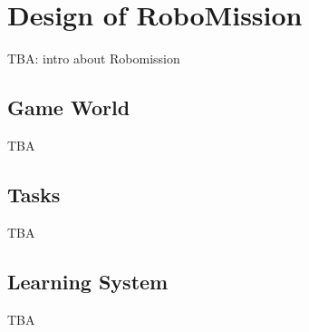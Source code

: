 \chapter{Design of RoboMission}
\label{chap:design-of-robomission}

TBA: intro about Robomission

\section{Game World}
\label{sec:robomission.game-world}

TBA

\section{Tasks}
\label{sec:robomission.tasks}

TBA


\section{Learning System}
\label{sec:robomission.system}

TBA
